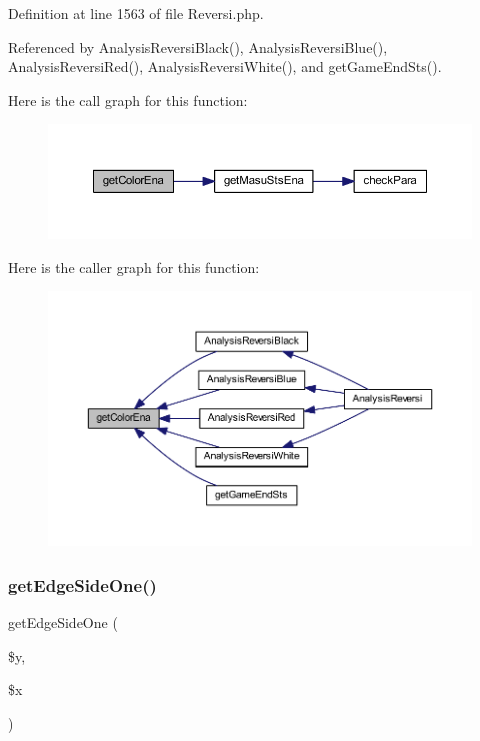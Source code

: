 Definition at line 1563 of file Reversi.\+php.



Referenced by Analysis\+Reversi\+Black(), Analysis\+Reversi\+Blue(), Analysis\+Reversi\+Red(), Analysis\+Reversi\+White(), and get\+Game\+End\+Sts().

Here is the call graph for this function\+:
\nopagebreak
\begin{figure}[H]
\begin{center}
\leavevmode
\includegraphics[width=350pt]{class_reversi_aead5ee041feb6ac2609266614ea06f78_cgraph}
\end{center}
\end{figure}
Here is the caller graph for this function\+:
\nopagebreak
\begin{figure}[H]
\begin{center}
\leavevmode
\includegraphics[width=350pt]{class_reversi_aead5ee041feb6ac2609266614ea06f78_icgraph}
\end{center}
\end{figure}
\mbox{\label{class_reversi_a98aff7f2db3a9feacbe98293c6b80eb4}} 
\subsubsection{\texorpdfstring{get\+Edge\+Side\+One()}{getEdgeSideOne()}}
{\footnotesize\ttfamily get\+Edge\+Side\+One (\begin{DoxyParamCaption}\item[{}]{\$y,  }\item[{}]{\$x }\end{DoxyParamCaption})}



